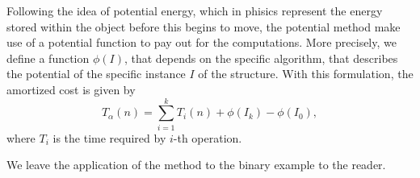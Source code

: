 \documentclass{subfiles}
\begin{document}
    Following the idea of potential energy,
        which in phisics represent the energy stored within the object before this begins to move,
        the potential method make use of a potential function to pay out for the computations.
        More precisely, we define a function \(\phi(I)\), that depends on the specific algorithm, 
        that describes the potential of the specific instance \(I\) of the structure.
        With this formulation, the amortized cost is given by 
        \[
            T_{\alpha}(n) = \sum_{i = 1}^{k} T_{i}(n) + \phi(I_{k}) - \phi(I_{0}),
        \]
        where \(T_{i}\) is the time required by \(i\)-th operation.

    We leave the application of the method to the binary example to the reader.
\end{document}
